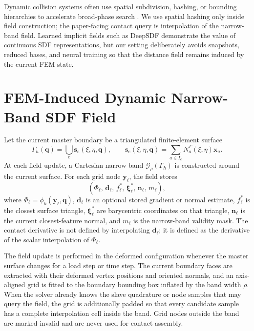 \documentclass[11pt]{article}
\begin{document}
Dynamic collision systems often use spatial subdivision, hashing, or bounding hierarchies to accelerate broad-phase search \cite{teschner2003optimized}. We use spatial hashing only inside field construction; the paper-facing contact query is interpolation of the narrow-band field. Learned implicit fields such as DeepSDF \cite{park2019deepsdf} demonstrate the value of continuous SDF representations, but our setting deliberately avoids snapshots, reduced bases, and neural training so that the distance field remains induced by the current FEM state.

\section{FEM-Induced Dynamic Narrow-Band SDF Field}

Let the current master boundary be a triangulated finite-element surface
\begin{equation}
\Gamma_h(\mathbf{q}) =
\bigcup_e \mathbf{s}_e(\xi,\eta,\mathbf{q}),
\qquad
\mathbf{s}_e(\xi,\eta,\mathbf{q})
=
\sum_{a\in I_e}N_a^\Gamma(\xi,\eta)\mathbf{x}_a .
\end{equation}
At each field update, a Cartesian narrow band \(\mathcal{G}_\rho(\Gamma_h)\) is constructed around the current surface. For each grid node \(\mathbf{y}_\ell\), the field stores
\begin{equation}
\left(
\Phi_\ell,\,
\mathbf{d}_\ell,\,
f_\ell^\ast,\,
\boldsymbol{\xi}_\ell^\ast,\,
\mathbf{n}_\ell,\,
m_\ell
\right),
\end{equation}
where \(\Phi_\ell=\phi_h(\mathbf{y}_\ell,\mathbf{q})\), \(\mathbf{d}_\ell\) is an optional stored gradient or normal estimate, \(f_\ell^\ast\) is the closest surface triangle, \(\boldsymbol{\xi}_\ell^\ast\) are barycentric coordinates on that triangle, \(\mathbf{n}_\ell\) is the current closest-feature normal, and \(m_\ell\) is the narrow-band validity mask. The contact derivative is not defined by interpolating \(\mathbf{d}_\ell\); it is defined as the derivative of the scalar interpolation of \(\Phi_\ell\).

The field update is performed in the deformed configuration whenever the master surface changes for a load step or time step. The current boundary faces are extracted with their deformed vertex positions and oriented normals, and an axis-aligned grid is fitted to the boundary bounding box inflated by the band width \(\rho\). When the solver already knows the slave quadrature or node samples that may query the field, the grid is additionally padded so that every candidate sample has a complete interpolation cell inside the band. Grid nodes outside the band are marked invalid and are never used for contact assembly.
\end{document}
